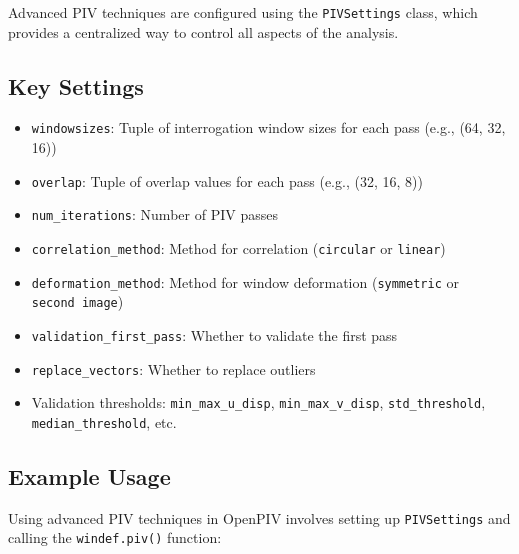 \documentclass[
  english,
  letterpaper,
  numbers=noendperiod,
  DIV=13]{scrreprt}
\providecommand{\tightlist}{%
  \setlength{\itemsep}{0pt}\setlength{\parskip}{0pt}}
\begin{document}
Advanced PIV techniques are configured using the \texttt{PIVSettings}
class, which provides a centralized way to control all aspects of the
analysis.

\subsection{Key Settings}\label{key-settings}

\begin{itemize}
\tightlist
\item
  \texttt{windowsizes}: Tuple of interrogation window sizes for each
  pass (e.g., (64, 32, 16))
\item
  \texttt{overlap}: Tuple of overlap values for each pass (e.g., (32,
  16, 8))
\item
  \texttt{num\_iterations}: Number of PIV passes
\item
  \texttt{correlation\_method}: Method for correlation
  (\texttt{circular} or \texttt{linear})
\item
  \texttt{deformation\_method}: Method for window deformation
  (\texttt{symmetric} or \texttt{second\ image})
\item
  \texttt{validation\_first\_pass}: Whether to validate the first pass
\item
  \texttt{replace\_vectors}: Whether to replace outliers
\item
  Validation thresholds: \texttt{min\_max\_u\_disp},
  \texttt{min\_max\_v\_disp}, \texttt{std\_threshold},
  \texttt{median\_threshold}, etc.
\end{itemize}

\subsection{Example Usage}\label{example-usage}

Using advanced PIV techniques in OpenPIV involves setting up
\texttt{PIVSettings} and calling the \texttt{windef.piv()} function:
\end{document}
